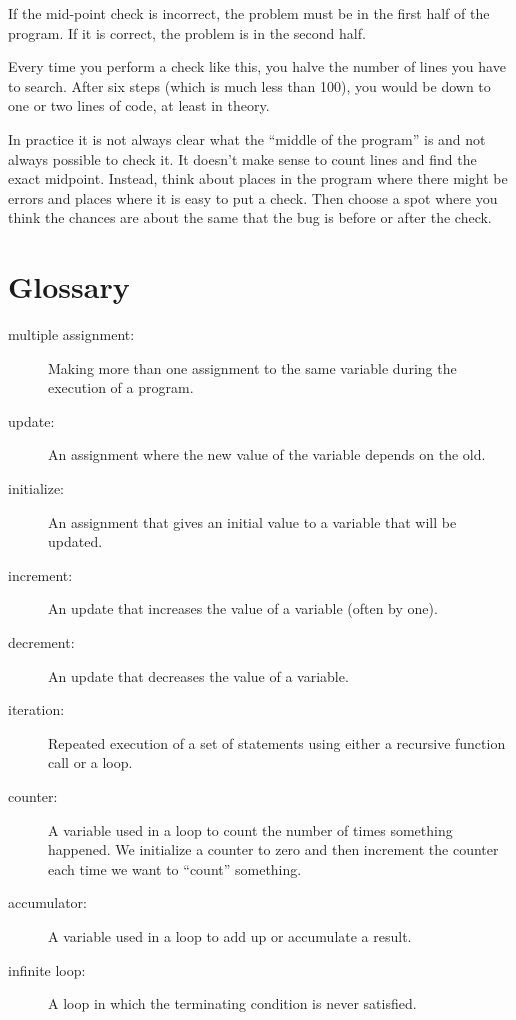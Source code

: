 \documentclass[10pt]{book}
\begin{document}
If the mid-point check is incorrect, the problem must be in the
first half of the program.  If it is correct, the problem is
in the second half.

Every time you perform a check like this, you halve the number
of lines you have to search.  After six steps (which is much
less than 100), you would be down to one or two lines of code,
at least in theory.

In practice it is not always clear what
the ``middle of the program'' is and not always possible to
check it.  It doesn't make sense to count lines and find the
exact midpoint.  Instead, think about places
in the program where there might be errors and places where it
is easy to put a check.  Then choose a spot where you
think the chances are about the same that the bug is before
or after the check.

\section{Glossary}

\begin{description}

\item[multiple assignment:] Making more than one assignment to the same
variable during the execution of a program.

\item[update:] An assignment where the new value of the variable
depends on the old.

\item[initialize:] An assignment that gives an initial value to
a variable that will be updated.

\item[increment:] An update that increases the value of a variable
(often by one).

\item[decrement:] An update that decreases the value of a variable.

\item[iteration:] Repeated execution of a set of statements using
either a recursive function call or a loop.

\item[counter:] A variable used in a loop to count the number
of times something happened.  We initialize a counter to 
zero and then increment the counter each time we want to
``count'' something.

\item[accumulator:] A variable used in a loop to add up or
accumulate a result.

\item[infinite loop:] A loop in which the terminating condition is
never satisfied.

\end{description}
\end{document}
